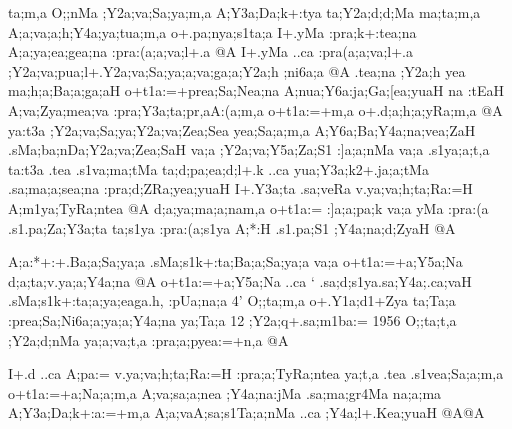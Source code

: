 \begin{spacing}{1.15}
{\sktf ta;m,a O;;nMa ;Y2a;va;Sa;ya;m,a A;Y3a;Da;k+:tya
ta;Y2a;d;d;Ma ma;ta;m,a A;a;va;a;h;Y4a;ya;tua;m,a o+.pa;nya;s1ta;a
I+.yMa :pra;k+:tea;na A;a;ya;ea;gea;na
:pra:(a;a;va;l+.a @A I+.yMa ..ca :pra(a;a;va;l+.a ;Y2a;va;pua;l+.Y2a;va;Sa;ya;a;va;ga;a;Y2a;h%
;ni6a;a @A .tea;na ;Y2a;h\ZF{,} yea ma;h;a;Ba;a;ga;aH
o+t1a:=+prea;Sa;Nea;na A;nua;Y6a:ja;Ga;[ea;yuaH\ZF{,} na
:tEaH A;va;Zya{;mea;va} :pra;Y3a;ta;pr,aA:(a;m,a o+t1a:=+m,a o+.d;a;h;a;yRa;m,a @A ya:t3a
;Y2a;va;Sa;ya;Y2a;va;Zea;Sea yea;Sa;a;m,a A;Y6a;Ba;Y4a;na;vea;ZaH
.sMa;ba;nDa;Y2a;va;Zea;SaH va;a ;Y2a;va;Y5a;Za;S1 :]a;a;nMa
va;a .s1ya;a;t,a\ZF{,} ta:t3a .tea .s1va;ma;tMa ta;d;pa;ea;d;l+.k
..ca yua;Y3a;k2+.ja;a;tMa .sa;ma;a;sea;na :pra;d;ZRa;yea;yuaH\ZF{,}
I+.Y3a;ta .sa;veRa v.ya;va;h;ta;Ra:=H A;m1ya{;TyRa};ntea @A
d;a;ya;ma;a;nam,a o+t1a:= :]a;a;pa;k va;a yMa
:pra:(a .s1.pa;Za;Y3a;ta\ZF{,} ta;s1ya
:pra:(a;s1ya A;*:H
.s1.pa;S1 ;Y4a;na;d;ZyaH @A}

\vskip 0.1cm

{\sktf A;a:*+:+.Ba;a;Sa;ya;a
.sMa;s1k+:ta;Ba;a;Sa;ya;a va;a o+t1a:=+a;Y5a;Na
d;a;ta;v.ya;a;Y4a;na @A o+t1a:=+a;Y5a;Na ..ca} `{\sktf
.sa;d;s1ya\ZF{-}.sa;Y4a;.ca;vaH\ZF{,} .sMa;s1k+:ta;a;ya;ea}{\sktf ga.h}, {\sktf :pUa;na;a 4}' {\sktf O;;ta;m,a o+.Y1a;d1+Zya ta;Ta;a
:prea;Sa;Ni6a;a;ya;a;Y4a;na\ZF{,} ya;Ta;a 12 ;Y2a;q+.sa;m1ba:=\ZF{,} 1956
O;;ta;t,a ;Y2a;d;nMa ya;a;va;t,a :pra;a;pyea:=+n,a @A}

\vskip 0.1cm

{\sktf I+.d ..ca A;pa:= v.ya;va;h;ta;Ra:=H
:pra;a;TyRa;ntea\ZF{,} ya;t,a .tea .s1vea;Sa;a;m,a o+t1a:=+a;Na;a;m,a
A;va;sa;a;nea ;Y4a;na:jMa .sa;ma;gr4Ma na;a;ma\ZF{,} A;Y3a;Da;k+:a:=+m,a\ZF{,}
A;a;vaA;sa;s1Ta;a;nMa ..ca ;Y4a;l+.Kea;yuaH @A@A}
\end{spacing}
\medskip

